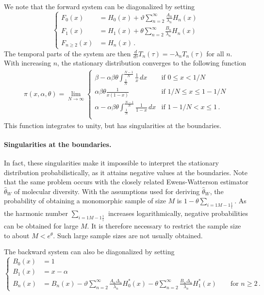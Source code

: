 \documentclass[preprint]{elsarticle}
\begin{document}
We note that the forward system can be diagonalized by setting 
\begin{equation}\label{eq:forw_bound_diag}
\begin{cases}
    F_0(x)&=H_0(x)+\vartheta \sum_{n=2}^\infty \frac{A_n}{\lambda_n}H_n(x)\\
    F_1(x)&=H_1(x)+\theta \sum_{n=2}^\infty \frac{B_n}{\lambda_n} H_n(x)\\
    F_{n\geq2}(x)&=H_n(x)\,.
\end{cases}
\end{equation}
The temporal parts of the system are then $\frac{d}{d\tau} T_n(\tau)= -\lambda_n T_n(\tau)$ for all $n$. With increasing $n$, the stationary distribution converges to the following function \citep{Vogl15,Vogl16}
\begin{align}\label{eq:forw_bounddrift-stat}
  \pi(x, \alpha, \theta) = \lim_{N\to\infty}
  \begin{cases}
    \beta-\alpha\beta\theta \int_{\tfrac1N}^{\tfrac{N-1}N} \frac1x\,dx     & \text{if } 0 \leq x < 1/N         \\
    \alpha\beta\theta\frac{1}{x(1-x)}                                                 & \text{if } 1/N \le x \le 1-1/N \\
    \alpha-\alpha\beta\theta \int_{\tfrac1N}^{\tfrac{N-1}N} \frac1{1-x}\,dx  & \text{if } 1-1/N < x \leq 1 \,.      \\
\end{cases}
\end{align}
This function integrates to unity, but has singularities at the boundaries. 
\paragraph{Singularities at the boundaries.} In fact, these singularities make it impossible to interpret the stationary distribution probabilistically, as it attains negative values at the boundaries.  
Note that the same problem occurs with the closely related Ewens-Watterson estimator $\hat \theta_W$ of molecular diversity. With the assumptions used for deriving $\hat \theta_W$, the probability of obtaining a monomorphic sample of size $M$ is $1-\theta\sum_{i=1{M-1}\frac1i}$. As the harmonic number $\sum_{i=1{M-1}\frac1i}$ increases logarithmically, negative probabilities can be obtained for large $M$. It is therefore necessary to restrict the sample size to about $M<e^\theta$. Such large sample sizes are not usually obtained.  

The backward system can also be diagonalized by setting
\begin{equation}\label{eq:backw_bound_diag}
\begin{cases}
    B_0(x)&=1\\
    B_1(x)&=x-\alpha\\
    B_n(x)&=B_n(x)-\vartheta \sum_{n=2}^\infty\frac{A_n\Delta_n}{\lambda_n} H_0^{*}(x)-\theta\sum_{n=2}^\infty \frac{B_n\Delta_n}{\lambda_n} H_1^{*}(x)\qquad\text{for $n\geq 2$}\,.
\end{cases}
\end{equation}
\end{document}
